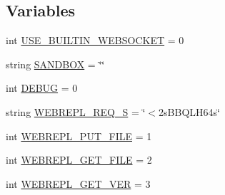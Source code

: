 \subsection*{Variables}
\begin{DoxyCompactItemize}
\item 
int \hyperlink{namespacewebrepl__cli_a5c13a602302a0aeb02d077f1b44ec640}{U\-S\-E\-\_\-\-B\-U\-I\-L\-T\-I\-N\-\_\-\-W\-E\-B\-S\-O\-C\-K\-E\-T} = 0
\item 
string \hyperlink{namespacewebrepl__cli_a16a43339b2b5fa32846d0685b5fc0ad1}{S\-A\-N\-D\-B\-O\-X} = \char`\"{}\char`\"{}
\item 
int \hyperlink{namespacewebrepl__cli_afd563c6dda8207ca3ac6cd56736f48c0}{D\-E\-B\-U\-G} = 0
\item 
string \hyperlink{namespacewebrepl__cli_a644284580e8ecbd4fd92e8311175b357}{W\-E\-B\-R\-E\-P\-L\-\_\-\-R\-E\-Q\-\_\-\-S} = \char`\"{}$<$2s\-B\-B\-Q\-L\-H64s\char`\"{}
\item 
int \hyperlink{namespacewebrepl__cli_a97bc67db549935463b4038f542a50439}{W\-E\-B\-R\-E\-P\-L\-\_\-\-P\-U\-T\-\_\-\-F\-I\-L\-E} = 1
\item 
int \hyperlink{namespacewebrepl__cli_a86a64935ffd35d145a81b502cdfc91b8}{W\-E\-B\-R\-E\-P\-L\-\_\-\-G\-E\-T\-\_\-\-F\-I\-L\-E} = 2
\item 
int \hyperlink{namespacewebrepl__cli_adb2fe0f21e14b1133168e8663088e627}{W\-E\-B\-R\-E\-P\-L\-\_\-\-G\-E\-T\-\_\-\-V\-E\-R} = 3
\end{DoxyCompactItemize}


